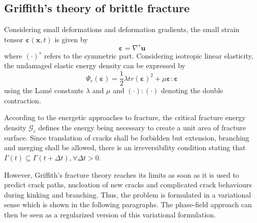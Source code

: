 \subsection{Griffith's theory of brittle fracture} \label{sec:formul_Griffith}
Considering small deformations and deformation gradients, the small strain tensor $\bm{\varepsilon}\left(\mathbf{x},t\right)$ is given by
\begin{equation}
	\bm{\varepsilon} = \nabla^{s}\mathbf{u}
\end{equation}
where $\left(\cdot\right)^{s}$ refers to the symmetric part. Considering isotropic linear elasticity, the undamaged elastic energy density can be expressed by
\begin{equation} \label{eq:psi_e}
	\Psi_ {e}\left(\bm{\varepsilon}\right) = \dfrac{1}{2}\lambda tr\left(\bm{\varepsilon}\right)^{2}+\mu\bm{\varepsilon}:\bm{\varepsilon}
\end{equation}
using the Lam\'{e} constants $\lambda$ and $\mu$ and $\left(\cdot\right):\left(\cdot\right)$ denoting the double contraction.

According to the energetic approaches to fracture, the critical fracture energy density $\mathcal{G}_{c}$ defines the energy being necessary to create a unit area of fracture surface. Since translation of cracks shall be forbidden but extension, branching and merging shall be allowed, there is an irreversibility condition stating that $\Gamma\left(t\right)\subseteq\Gamma\left(t+\Delta t\right), \forall \Delta t>0$.

However, Griffith's fracture theory reaches its limits as soon as it is used to predict crack paths, nucleation of new cracks and complicated crack behaviours during kinking and branching. Thus, the problem is formulated in a variational sense which is shown in the following paragraphs. The phase-field approach can then be seen as a regularized version of this variational formulation. \citep{05_PF_ductile}

